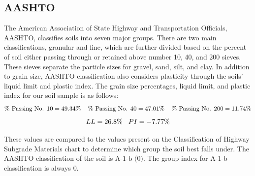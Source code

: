 \documentclass{article}
\begin{document}
\subsection{AASHTO}
\par The American Association of State Highway and Transportation Officials, AASHTO, classifies soils into seven major groups. There are two main classifications, granular and fine, which are further divided based on the percent of soil either passing through or retained above number 10, 40, and 200 sieves. These sieves separate the particle sizes for gravel, sand, silt, and clay. In addition to grain size, AASHTO classification also considers plasticity through the soils' liquid limit and plastic index. The grain size percentages, liquid limit, and plastic index for our soil sample is as follows:  
\[\% \text{ Passing No. 10}=49.34\%\hspace{4mm}\% \text{ Passing No. 40}=47.01\%\hspace{4mm}\% \text{ Passing No. 200}=11.74\%\]
\[LL=26.8\%\hspace{3mm}PI=-7.77\%\] 

\par These values are compared to the values present on the Classification of Highway Subgrade Materials chart to determine which group the soil best falls under. The AASHTO classification of the soil is $\boxed{\text{A-1-b (0)}}$. The group index for A-1-b classification is always 0. 
\end{document}
